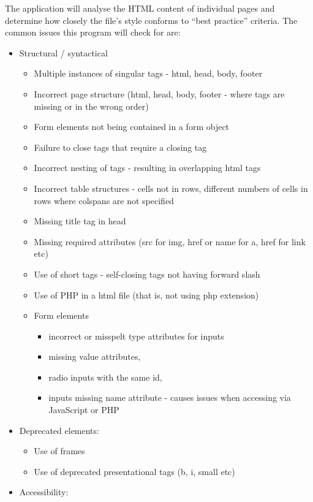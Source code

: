 \documentclass[12pt]{article}
\begin{document}
The application will analyse the HTML content of individual pages and determine how closely the file's style conforms to ``best practice'' criteria. The common issues this program will check for are:
\begin{itemize}
\item Structural / syntactical
\begin{itemize}
\item Multiple instances of singular tags - html, head, body, footer
\item Incorrect page structure (html, head, body, footer - where tags are missing or in the wrong order)
\item Form elements not being contained in a form object
\item Failure to close tags that require a closing tag
\item Incorrect nesting of tags - resulting in overlapping html tags
\item Incorrect table structures - cells not in rows, different numbers of cells in rows where colspans are not specified
\item Missing title tag in head
\item Missing required attributes (src for img, href or name for a, href for link etc)
\item Use of short tags - self-closing tags not having forward slash
\item Use of PHP in a html file (that is, not using php extension)
\item Form elements
\begin{itemize}
\item incorrect or misspelt type attributes for inputs
\item missing value attributes,
\item radio inputs with the same id,
\item inputs missing name attribute - causes issues when accessing via \\ JavaScript or PHP
\end{itemize}\end{itemize}
\item Deprecated elements:
\begin{itemize}
\item Use of frames
\item Use of deprecated presentational tags (b, i, small etc)
\end{itemize}
\item Accessibility:
\begin{itemize}

\end{itemize}
\end{itemize}
\end{document}
